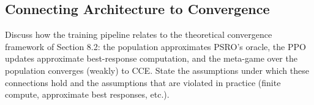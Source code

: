 \subsection{Connecting Architecture to Convergence}
Discuss how the training pipeline relates to the theoretical convergence framework of Section 8.2: the population approximates PSRO's oracle, the PPO updates approximate best-response computation, and the meta-game over the population converges (weakly) to CCE. State the assumptions under which these connections hold and the assumptions that are violated in practice (finite compute, approximate best responses, etc.).
